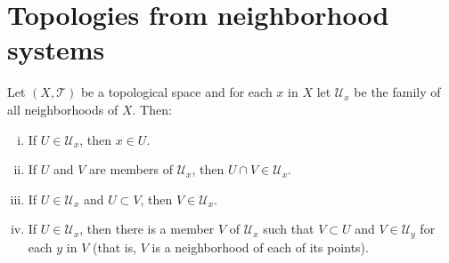 \section{Topologies from neighborhood systems}\label{sec:topologies-from-neighborhood-systems}

\begin{problem}
  Let $(X,\mathcal{T})$ be a topological space and for each $x$ in $X$ let
  $\mathcal{U}_{x}$ be the family of all neighborhoods of $X$. Then:
  \begin{enumerate}[(i)]
    \item
      If $U\in{\mathcal{U}_{x}}$, then $x\in{U}$.
    \item
      If $U$ and $V$ are members of $\mathcal{U}_{x}$, then
      $U\cap{V}\in{\mathcal{U}_{x}}$.
    \item
      If $U\in{\mathcal{U}_{x}}$ and $U\subset{V}$, then
      $V\in{\mathcal{U}_{x}}$.
    \item
      If $U\in{\mathcal{U}_{x}}$, then there is a member $V$ of
      $\mathcal{U}_{x}$ such that $V\subset{U}$ and $V\in{\mathcal{U}_{y}}$ for
      each $y$ in $V$ (that is, $V$ is a neighborhood of each of its points).
  \end{enumerate}
\end{problem} 
